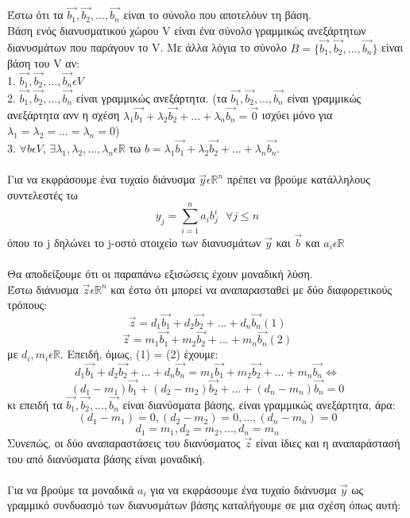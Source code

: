 \documentclass[12pt]{article}
\newcommand{\R}{\mathbb{R}}
\begin{document}
Έστω ότι τα $\vec{b_1}, \vec{b_2},...,\vec{b_n}$ είναι το σύνολο που αποτελόυν τη βάση. \\
Βάση ενός διανυσματικού χώρου V είναι ένα σύνολο γραμμικώς ανεξάρτητων διανυσμάτων που παράγουν το V. Με άλλα λόγια το σύνολο $B=\{\vec{b_1}, \vec{b_2},...,\vec{b_n}\}$ είναι βάση του V αν: \\
1. $\vec{b_1}, \vec{b_2},...,\vec{b_n} \epsilon V$ \\
2. $\vec{b_1}, \vec{b_2},...,\vec{b_n}$ είναι γραμμικώς ανεξάρτητα. (τα $\vec{b_1}, \vec{b_2},...,\vec{b_n}$ είναι γραμμικώς ανεξάρτητα ανν η σχέση $λ_1\vec{b_1} + λ_2\vec{b_2} + ... + λ_n\vec{b_n} = \vec{0}$ ισχύει μόνο για $λ_1=λ_2=...=λ_n = 0$) \\
3. $\forall b \epsilon V$, $\exists λ_1,λ_2,...,λ_n \epsilon \R$ τω $b = λ_1\vec{b_1} + λ_2\vec{b_2} + ... + λ_n\vec{b_n}$. \\ \\
Για να εκφράσουμε ένα τυχαίο διάνυσμα $\vec{y}\epsilon \R^n$ πρέπει να βρούμε κατάλληλους συντελεστές τω 
$$ y_j = \sum_{i=1}^{n}{a_ib_j^i} \mbox{     } \forall j \leq n $$ όπου το j δηλώνει το j-οστό στοιχείο των διανυσμάτων $\vec{y}$ και $\vec{b}$ και $a_i \epsilon \R$ \\ \\
Θα αποδείξουμε ότι οι παραπάνω εξισώσεις έχουν μοναδική λύση. \\
Έστω διάνυσμα $\vec{z} \epsilon \R^n$ και έστω ότι μπορεί να αναπαρασταθεί με δύο διαφορετικούς τρόπους: \\
$$ \vec{z} = d_1\vec{b_1} + d_2\vec{b_2} + ... + d_n\vec{b_n} (1)$$
$$ \vec{z} = m_1\vec{b_1} + m_2\vec{b_2} + ... + m_n\vec{b_n} (2)$$
με $d_i,m_i \epsilon \R$. Επειδή, όμως, (1) = (2) έχουμε: 
$$ d_1\vec{b_1} + d_2\vec{b_2} + ... + d_n\vec{b_n} = m_1\vec{b_1} + m_2\vec{b_2} + ... + m_n\vec{b_n} \Leftrightarrow$$
$$ (d_1-m_1)\vec{b_1} + (d_2-m_2)\vec{b_2} + ... + (d_n-m_n)\vec{b_n} = 0 $$ 
κι επειδή τα $\vec{b_1}, \vec{b_2},...,\vec{b_n}$ είναι διανύσματα βάσης, είναι γραμμικώς ανεξάρτητα, άρα: \\
$$ (d_1-m_1) = 0, (d_2-m_2) = 0, ... , (d_n-m_n) = 0 $$ 
$$ d_1 = m_1, d_2 = m_2, ...,d_n = m_n $$
Συνεπώς, οι δύο αναπαραστάσεις του διανύσματος $\vec{z}$ είναι ίδιες και η αναπαράστασή του από διανύσματα βάσης είναι μοναδική. \\  \\
Για να βρούμε τα μοναδικά $a_i$ για να εκφράσουμε ένα τυχαίο διάνυσμα $\vec{y}$ ως γραμμικό συνδυασμό των διανυσμάτων βάσης καταλήγουμε σε μια σχέση όπως αυτή: \\
\end{document}
